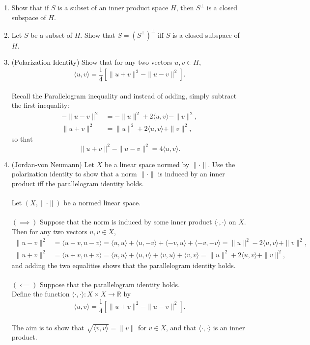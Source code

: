 \begin{enumerate}
    \item Show that if $S$ is a subset of an inner product space $H$, then $S^\perp$ is a closed subspace of $H$.
    \item Let $S$ be a subset of $H$. Show that $S=(S^\perp)^\perp$ iff $S$ is a closed subspace of $H$.
    \item (Polarization Identity) Show that for any two vectors $u,v\in H$,
    \[
        \langle u,v \rangle = \frac{1}{4}[\|u+v\|^2-\|u-v\|^2].
    \]
    \\Recall the Parallelogram inequality and instead of adding, simply subtract the first inequality:
    \begin{align*}
        -\|u-v\|^2&=-\|u\|^2+2\langle u,v\rangle-\|v\|^2,\\
        \|u+v\|^2&=\|u\|^2+2\langle u,v\rangle+\|v\|^2,
    \end{align*}
    so that
    \[
        \|u+v\|^2-\|u-v\|^2=4\langle u,v\rangle.
    \]
    \item (Jordan-von Neumann) Let $X$ be a linear space normed by $\|\cdot\|$. Use the polarization identity to show that a norm $\|\cdot\|$ is induced by an inner product iff the parallelogram identity holds.\\
    \\Let $(X,\|\cdot\|)$ be a normed linear space.\\
    \\$(\implies)$ Suppose that the norm is induced by some inner product $\langle \cdot,\cdot\rangle$ on $X$.
    \\Then for any two vectors $u,v\in X$,
    \begin{align*}
        \|u-v\|^2&=\langle u-v,u-v\rangle=\langle u,u\rangle+\langle u,-v\rangle+\langle -v,u\rangle+\langle -v,-v\rangle=\|u\|^2-2\langle u,v\rangle+\|v\|^2,\\
        \|u+v\|^2&=\langle u+v,u+v\rangle=\langle u,u\rangle+\langle u,v\rangle+\langle v,u\rangle+\langle v,v\rangle=\|u\|^2+2\langle u,v\rangle+\|v\|^2,
    \end{align*}
    and adding the two equalities shows that the parallelogram identity holds.\\
    \\$(\impliedby)$ Suppose that the parallelogram identity holds.
    \\Define the function $\langle\cdot,\cdot\rangle:X\times X\to\mathbb{R}$ by
    \[
        \langle u,v \rangle = \frac{1}{4}[\|u+v\|^2-\|u-v\|^2].
    \]
    \\The aim is to show that $\sqrt{\langle v,v\rangle}=\|v\|$ for $v\in X$, and that $\langle\cdot,\cdot\rangle$ is an inner product.

\end{enumerate}
